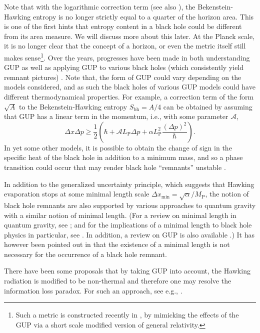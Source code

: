\documentclass[12pt]{article}
\newcommand{\2}{$^2$}
\newcommand{\3}{$^3$}
\newcommand{\4}{$_4$}
\newcommand{\5}{$_5$}
\begin{document}
Note that with the logarithmic correction term (see also \cite{0611028}), the Bekenstein-Hawking entropy is no longer strictly equal to a quarter of the horizon area. This is one of the first hints that entropy content in a black hole could be different from its area measure. We will discuss more about this later. At the Planck scale, it is no longer clear that the concept of a horizon, or even the metric itself still makes sense\footnote{Such a metric is constructed recently in \cite{IMN}, by mimicking the effects of the GUP via a short scale modified version of general relativity. }.  Over the years, progresses have been made in both understanding GUP as well as applying GUP to various black holes (which consistently yield remnant pictures) \cite{0511054, 0704.1261, 1002.2302, DCXZ, 1306.5298, 1307.7045, 1307.1894, 1307.0172, 1312.3781, 1402.2133, 1404.6375, HAK, AHM}. Note that, the form of GUP could vary depending on the models considered, and as such the black holes of various GUP models could have different thermodynamical properties. For example, a correction term of the form $\sqrt{A}$ to the Bekenstein-Hawking entropy $S_{\text{bh}}=A/4$ can be obtained \cite{1402.2133} by assuming that GUP has a linear term in the momentum, i.e., with some parameter $\mathcal{A}$,
\begin{equation}
\Delta x\Delta p \geqslant\frac{1}{2}\left(\hbar + \mathcal{A}  L_{\text{P}} \Delta p+ \alpha L_{\text{P}}^2\frac{(\Delta p)^2}{\hbar}\right).
\end{equation}
In yet some other models, it is possible to obtain the change of sign in the specific heat of the black hole in addition to a minimum mass, and so a phase transition could occur that  may render black hole ``remnants'' unstable \cite{1205.3680}. 

In addition to the generalized uncertainty principle, which suggests that Hawking evaporation stops at some minimal length scale $\Delta x_{\mathrm{min}} = \sqrt{\alpha}/M_{\mathrm{P}}$, 
the notion of black hole remnants are also supported by various approaches to quantum gravity with a similar notion of minimal length. (For a review on minimal length in quantum gravity, see \cite{sabine2}; and for the implications of a minimal length to black hole physics in particular, see \cite{CMN}. In addition, a review on GUP is also available \cite{tawfik}.)  It has however been pointed out in \cite{DMZ} that the existence of a minimal length is not necessary for the occurrence of a black hole remnant. 

There have been some proposals that by taking GUP into account, the Hawking radiation is modified to be non-thermal and therefore one may resolve the information loss paradox. For such an approach, see e.g., \cite{0804.4221, 0905.0948}. 
\end{document}
